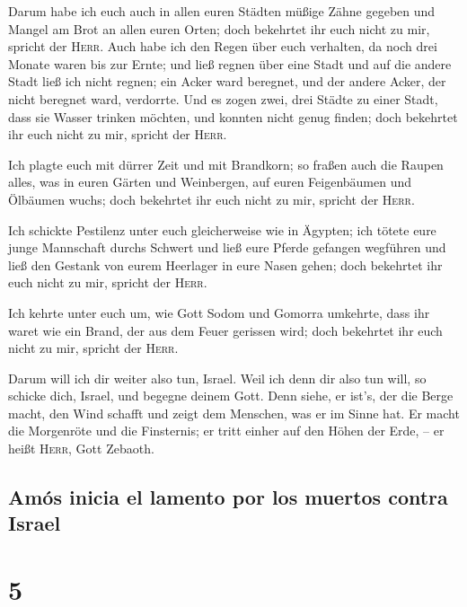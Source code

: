  Darum habe ich euch auch in allen euren Städten müßige
Zähne gegeben und Mangel am Brot an allen euren Orten; doch bekehrtet
ihr euch nicht zu mir, spricht der \textsc{Herr}.  Auch
habe ich den Regen über euch verhalten, da noch drei Monate waren bis
zur Ernte; und ließ regnen über eine Stadt und auf die andere Stadt ließ
ich nicht regnen; ein Acker ward beregnet, und der andere Acker, der
nicht beregnet ward, verdorrte.  Und es zogen zwei, drei
Städte zu einer Stadt, dass sie Wasser trinken möchten, und konnten
nicht genug finden; doch bekehrtet ihr euch nicht zu mir, spricht der
\textsc{Herr}.

 Ich plagte euch mit dürrer Zeit und mit Brandkorn; so
fraßen auch die Raupen alles, was in euren Gärten und Weinbergen, auf
euren Feigenbäumen und Ölbäumen wuchs; doch bekehrtet ihr euch nicht zu
mir, spricht der \textsc{Herr}.

 Ich schickte Pestilenz unter euch gleicherweise wie in
Ägypten; ich tötete eure junge Mannschaft durchs Schwert und ließ eure
Pferde gefangen wegführen und ließ den Gestank von eurem Heerlager in
eure Nasen gehen; doch bekehrtet ihr euch nicht zu mir, spricht der
\textsc{Herr}.

 Ich kehrte unter euch um, wie Gott Sodom und Gomorra
umkehrte, dass ihr waret wie ein Brand, der aus dem Feuer gerissen wird;
doch bekehrtet ihr euch nicht zu mir, spricht der \textsc{Herr}.

 Darum will ich dir weiter also tun, Israel. Weil ich
denn dir also tun will, so schicke dich, Israel, und begegne deinem
Gott.  Denn siehe, er ist's, der die Berge macht, den
Wind schafft und zeigt dem Menschen, was er im Sinne hat. Er macht die
Morgenröte und die Finsternis; er tritt einher auf den Höhen der Erde,
-- er heißt \textsc{Herr}, Gott Zebaoth.

\hypertarget{amuxf3s-inicia-el-lamento-por-los-muertos-contra-israel}{%
\subsection{Amós inicia el lamento por los muertos contra
Israel}\label{amuxf3s-inicia-el-lamento-por-los-muertos-contra-israel}}

\hypertarget{section-4}{%
\section{5}\label{section-4}}

